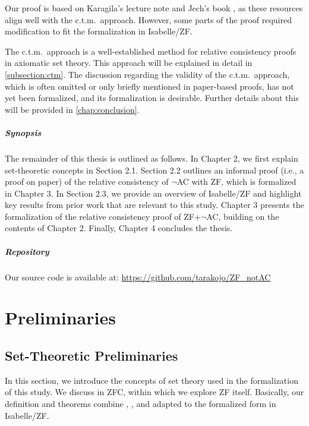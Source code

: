 \documentclass{report}
\begin{document}
Our proof is based on Karagila's lecture note \cite{karagila} and Jech's book \cite{jech_AC},
as these resources align well with the c.t.m.\  approach.
However, some parts of the proof required modification to fit the formalization in Isabelle/ZF.

The c.t.m.\ approach is a well-established method for relative consistency proofs in axiomatic set theory.
This approach will be explained in detail in \cref{subsection:ctm}.
The discussion regarding the validity of the c.t.m.\ approach, 
which is often omitted or only briefly mentioned in paper-based proofs, has not yet been formalized, and its formalization is desirable.
Further details about this will be provided in \cref{chap:conclusion}.


\paragraph{Synopsis}
The remainder of this thesis is outlined as follows.
In Chapter 2, we first explain set-theoretic concepts in Section 2.1.
Section 2.2 outlines an informal proof (i.e., a proof on paper) of the relative consistency of $\neg$AC with ZF, which is formalized in Chapter 3.
In Section 2.3, we provide an overview of Isabelle/ZF and highlight key results from prior work that are relevant to this study.
Chapter 3 presents the formalization of the relative consistency proof of ZF+$\neg$AC, building on the contents of Chapter 2.
Finally, Chapter 4 concludes the thesis.

\paragraph{Repository}
Our source code is available at: \url{https://github.com/tarakojo/ZF_notAC}




\chapter{Preliminaries}\label{chap:preliminaries}



\section{Set-Theoretic Preliminaries}
In this section, we introduce the concepts of set theory used in the formalization of this study.
We discuss in ZFC, within which we explore ZF itself. 
Basically, our definition and theorems combine \cite{kunen2011}, \cite{karagila}, and \cite{jech_AC}
adapted to the formalized form in Isabelle/ZF.
\end{document}
